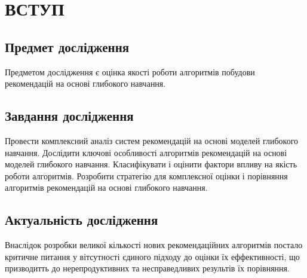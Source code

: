 \section*{ВСТУП}
\subsection*{Предмет дослідження}
Предметом дослідження є оцінка якості роботи алгоритмів побудови рекомендацій на основі глибокого навчання. 
\subsection*{Завдання дослідження}
Провести комплексний аналіз систем рекомендацій на основі моделей глибокого навчання. Дослідити ключові особливості алгоритмів рекомендацій на основі моделей глибокого навчання. Класифікувати і оцінити фактори впливу на якість роботи алгоритмів. Розробити стратегію для комплексної оцінки і порівняння алгоритмів рекомендацій на основі глибокого навчання. 
\subsection*{Актуальність дослідження}
Внаслідок розробки великої кількості нових рекомендаційних алгоритмів постало критичне питання у вітсутності єдиного підходу до оцінки їх еффективності, що призводитть до нерепродуктивних та несправедливих результів їх порівняння.
